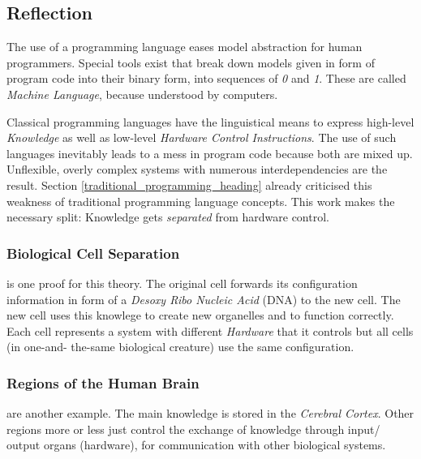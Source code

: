 %
%
%
%
%
%
%

\subsection{Reflection}
\label{reflection_heading}

The use of a programming language eases model abstraction for human programmers.
Special tools exist that break down models given in form of program code into
their binary form, into sequences of \emph{0} and \emph{1}. These are called
\emph{Machine Language}, because understood by computers.

Classical programming languages have the linguistical means to express high-level
\emph{Knowledge} as well as low-level \emph{Hardware Control Instructions}. The
use of such languages inevitably leads to a mess in program code because both are
mixed up. Unflexible, overly complex systems with numerous interdependencies are
the result. Section \ref{traditional_programming_heading} already criticised this
weakness of traditional programming language concepts. This work makes the
necessary split: Knowledge gets \emph{separated} from hardware control.

\subsubsection{Biological Cell Separation} is one proof for this theory.
The original cell forwards its configuration information in form of a
\emph{Desoxy Ribo Nucleic Acid} (DNA) to the new cell. The new cell uses this
knowlege to create new organelles and to function correctly. Each cell represents
a system with different \emph{Hardware} that it controls but all cells (in one-and-
the-same biological creature) use the same configuration.

\subsubsection{Regions of the Human Brain} are another example. The main knowledge
is stored in the \emph{Cerebral Cortex}. Other regions more or less just control
the exchange of knowledge through input/ output organs (hardware), for
communication with other biological systems.
